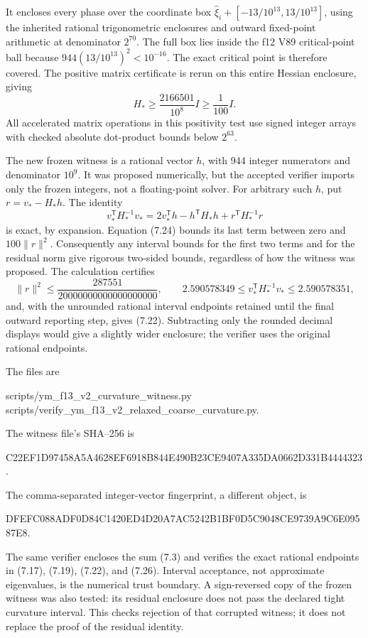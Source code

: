 \documentclass[11pt,oneside]{article}
\begin{document}
It encloses every phase over the
coordinate box
\(\widehat\xi_i+[-13/10^{13},13/10^{13}]\),
using the inherited rational
trigonometric enclosures and
outward fixed-point arithmetic
at denominator \(2^{70}\).
The full box lies inside the
f12 V89 critical-point ball
because \(944(13/10^{13})^2<10^{-16}\).
The exact critical point is
therefore covered. The positive
matrix certificate is rerun on
this entire Hessian enclosure,
giving
\[
                        H_*\ge\frac{2166501}{10^8}I
                                      \ge\frac1{100}I.
 \tag{7.24}
\]
All accelerated matrix operations
in this positivity test use
signed integer arrays with
checked absolute dot-product
bounds below \(2^{63}\).

The new frozen witness is a
rational vector \(h\), with 944
integer numerators and denominator
\(10^9\). It was proposed
numerically, but the accepted
verifier imports only the frozen
integers, not a floating-point
solver. For arbitrary such \(h\),
put \(r=v_*-H_*h\). The identity
\[
 v_*^{\mathsf T}H_*^{-1}v_*
    =2v_*^{\mathsf T}h-h^{\mathsf T}H_*h
                                      +r^{\mathsf T}H_*^{-1}r
 \tag{7.25}
\]
is exact, by expansion.
Equation (7.24) bounds its last
term between zero and \(100\|r\|^2\).
Consequently any interval bounds
for the first two terms and for
the residual norm give rigorous
two-sided bounds, regardless
of how the witness was proposed.
The calculation certifies
\[
 \|r\|^2\le
       \frac{287551}{20000000000000000000},
 \qquad
 2.590578349\le v_*^{\mathsf T}H_*^{-1}v_*
                                      \le2.590578351,
 \tag{7.26}
\]
and, with the unrounded rational
interval endpoints retained until
the final outward reporting step, gives
(7.22). Subtracting only the
rounded decimal displays would
give a slightly wider enclosure;
the verifier uses the original
rational endpoints.

The files are
\begin{center}\small\ttfamily
scripts/ym\_f13\_v2\_curvature\_witness.py\\
scripts/verify\_ym\_f13\_v2\_relaxed\_coarse\_curvature.py.
\end{center}
The witness file's SHA--256 is
\begin{center}\scriptsize\ttfamily
C22EF1D97458A5A4628EF6918B844E490B23CE9407A335DA0662D331B4444323.
\end{center}
The comma-separated integer-vector
fingerprint, a different object,
is
\begin{center}\scriptsize\ttfamily
DFEFC088ADF0D84C1420ED4D20A7AC5242B1BF0D5C9048CE9739A9C6E09587E8.
\end{center}
The same verifier encloses
the sum (7.3) and verifies
the exact rational endpoints
in (7.17), (7.19), (7.22),
and (7.26). Interval acceptance,
not approximate eigenvalues,
is the numerical trust boundary.
A sign-reversed copy of the
frozen witness was also tested:
its residual enclosure does not
pass the declared tight curvature
interval. This checks rejection
of that corrupted witness; it
does not replace the proof of
the residual identity.
\end{document}
